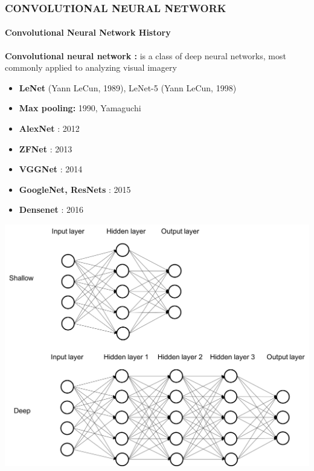 \documentclass[11pt]{beamer}
\begin{document}
	\begin{frame}
		\frametitle{\textbf{CONVOLUTIONAL NEURAL NETWORK}}
		\framesubtitle{Convolutional Neural Network History}  %
		\textbf{Convolutional neural network : }   is a class of deep neural networks, most commonly applied to analyzing visual imagery %
		\begin{minipage}{0.5\textwidth}
			\begin{itemize}
				\item \textbf{LeNet} (Yann LeCun, 1989), LeNet-5 (Yann LeCun, 1998)
				\item \textbf{Max pooling:} 1990, Yamaguchi
				\item \textbf{AlexNet} : 2012
				\item \textbf{ZFNet} : 2013
				\item \textbf{VGGNet} : 2014
				\item \textbf{GoogleNet, ResNets} : 2015
				\item \textbf{Densenet} : 2016
			\end{itemize}
		\end{minipage}
		\begin{minipage}{0.4\textwidth}
			\includegraphics[scale=0.2]{shallow_deep_learning.png}
		\end{minipage}
	\end{frame}
\end{document}
